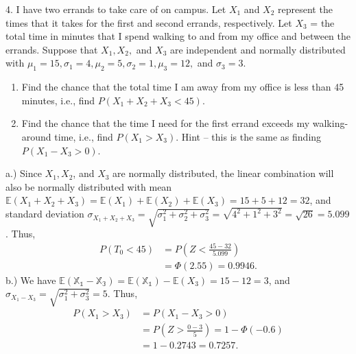 \documentclass{report}
\begin{document}
\pagebreak \bigbreak \noindent 
\begin{mdframed}
    4. I have two errands to take care of on campus. Let \(X_1\) and \(X_2\) represent the times that it takes for the first and second errands, respectively. Let \(X_3\) = the total time in minutes that I spend walking to and from my office and between the errands. Suppose that \(X_1, X_2,\) and \(X_3\) are independent and normally distributed with \(\mu_1 = 15, \sigma_1 = 4, \mu_2 = 5, \sigma_2 = 1, \mu_3 = 12,\) and \(\sigma_3 = 3\).
    \begin{enumerate}[label=(\alph*)]
        \item Find the chance that the total time I am away from my office is less than 45 minutes, i.e., find \(P(X_1 + X_2 + X_3 < 45)\).
        \item Find the chance that the time I need for the first errand exceeds my walking-around time, i.e., find \(P(X_1 > X_3)\). Hint – this is the same as finding \(P(X_1 - X_3 > 0)\).
    \end{enumerate}
\end{mdframed}
\bigbreak \noindent 
a.) Since $X_{1}, X_{2}$, and $X_{3}$ are normally distributed, the linear combination will also be normally distributed with mean $\mathbb{E}(X_{1} + X_{2} + X_{3}) = \mathbb{E}(X_{1}) + \mathbb{E}(X_{2}) + \mathbb{E}(X_{3})  = 15 + 5 + 12 = 32$, and standard deviation $\sigma_{X_{1} + X_{2} + X_{3}} = \sqrt{\sigma_{1}^{2} + \sigma_{2}^{2} + \sigma_{3}^{2}} = \sqrt{4^{2} + 1^{2} + 3^{2}} = \sqrt{26} = 5.099$. Thus,
\begin{align*}
    P(T_{0} < 45) &= P\left(Z < \frac{45-32}{5.099}\right)  \\
                  &= \Phi(2.55) = 0.9946
.\end{align*}
\bigbreak \noindent 
b.) We have $\mathbb{E(X_{1} - X_{3})}  = \mathbb{E(X_{1})} - \mathbb{E}(X_{3}) = 15 -12 = 3$, and $\sigma_{X_{1} - X_{3}} = \sqrt{\sigma_{1}^{2} + \sigma_{3}^{2}}  =5$. Thus,
\begin{align*}
    P(X_{1} > X_{3}) &= P(X_{1} - X_{3} > 0) \\
    &=P(Z > \frac{0-3}{5}) = 1-\Phi(-0.6) \\
    &= 1-0.2743 = 0.7257
.\end{align*}




 
\end{document}
